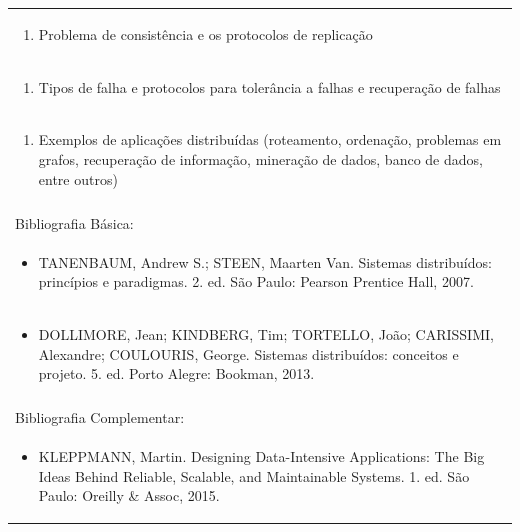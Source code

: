 \documentclass[11pt]{article}
\begin{document}
\begin{center}
\begin{longtable}{|p{4cm}|p{4cm}|p{4cm}|p{4cm}|}
\multicolumn{4}{|p{\dimexpr 16cm + 6\tabcolsep\relax}|}{\begin{enumerate}[start=7]\item Problema de consistência e os protocolos de replicação\end{enumerate}}\\
\multicolumn{4}{|p{\dimexpr 16cm + 6\tabcolsep\relax}|}{\begin{enumerate}[start=8]\item Tipos de falha e protocolos para tolerância a falhas e recuperação de falhas\end{enumerate}}\\
\multicolumn{4}{|p{\dimexpr 16cm + 6\tabcolsep\relax}|}{\begin{enumerate}[start=9]\item Exemplos de aplicações distribuídas (roteamento, ordenação, problemas em grafos, recuperação de informação, mineração de dados, banco de dados, entre outros)\end{enumerate}}\\
\multicolumn{4}{|p{\dimexpr 16cm + 6\tabcolsep\relax}|}{}\\
\hline
\multicolumn{4}{|p{16cm}|}{Bibliografia Básica:}\\*
\multicolumn{4}{|p{\dimexpr 16cm + 6\tabcolsep\relax}|}{\begin{itemize}\item TANENBAUM, Andrew S.; STEEN, Maarten Van. Sistemas distribuídos: princípios e paradigmas. 2. ed. São Paulo: Pearson Prentice Hall, 2007.\end{itemize}}\\
\multicolumn{4}{|p{\dimexpr 16cm + 6\tabcolsep\relax}|}{\begin{itemize}\item DOLLIMORE, Jean; KINDBERG, Tim; TORTELLO, João; CARISSIMI, Alexandre; COULOURIS, George. Sistemas distribuídos: conceitos e projeto. 5. ed. Porto Alegre: Bookman, 2013.\end{itemize}}\\
\multicolumn{4}{|p{16cm}|}{}\\
\hline
\multicolumn{4}{|p{16cm}|}{Bibliografia Complementar:}\\*
\multicolumn{4}{|p{\dimexpr 16cm + 6\tabcolsep\relax}|}{\begin{itemize}\item KLEPPMANN, Martin. Designing Data-Intensive Applications: The Big Ideas Behind Reliable, Scalable, and Maintainable Systems. 1. ed. São Paulo: Oreilly \& Assoc, 2015.\end{itemize}}\\

\end{longtable}
\end{center}
\end{document}
